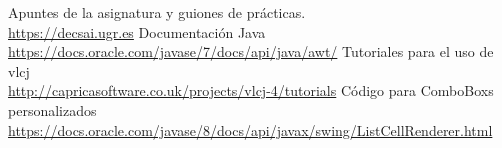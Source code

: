 
\clearpage
\begin{thebibliography}{X}
\bibitem{} Apuntes de la asignatura y guiones de prácticas.\\
\url{https://decsai.ugr.es}
\bibitem{} Documentación Java \\ \url{https://docs.oracle.com/javase/7/docs/api/java/awt/}
\bibitem{} Tutoriales para el uso de vlcj \\ \url{http://capricasoftware.co.uk/projects/vlcj-4/tutorials}
\bibitem{} Código para ComboBoxs personalizados 
\url{https://docs.oracle.com/javase/8/docs/api/javax/swing/ListCellRenderer.html}
\end{thebibliography}

